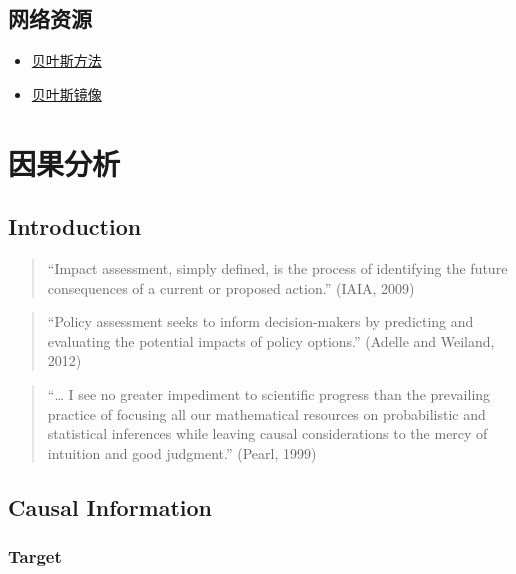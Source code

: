 \documentclass[]{book}
\providecommand{\tightlist}{%
  \setlength{\itemsep}{0pt}\setlength{\parskip}{0pt}}
\begin{document}
\hypertarget{bayeslink}{%
\section{网络资源}\label{bayeslink}}

\begin{itemize}
\tightlist
\item
  \href{http://mindhacks.cn/2008/09/21/the-magical-bayesian-method/}{贝叶斯方法}
\item
  \href{https://github.com/mavelli/rocker-bayesian}{贝叶斯镜像}
\end{itemize}

\hypertarget{why}{%
\chapter{因果分析}\label{why}}

\hypertarget{introduction}{%
\section{Introduction}\label{introduction}}

\begin{quote}
``Impact assessment, simply defined, is the process of identifying the future consequences of a current or proposed action.'' (IAIA, 2009)
\end{quote}

\begin{quote}
``Policy assessment seeks to inform decision-makers by predicting and evaluating the potential impacts of policy options.'' (Adelle and Weiland, 2012)
\end{quote}

\begin{quote}
``\ldots{} I see no greater impediment to scientific progress than the prevailing practice of focusing all our mathematical resources on probabilistic and statistical inferences while leaving causal considerations to the mercy of intuition and good judgment.'' (Pearl, 1999)
\end{quote}

\hypertarget{causal-information}{%
\section{Causal Information}\label{causal-information}}

\hypertarget{target}{%
\subsection{Target}\label{target}}
\end{document}
